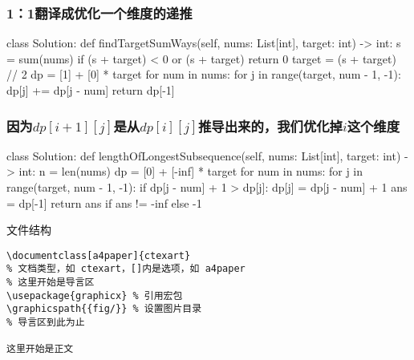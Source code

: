 \begin{frame}[fragile]          %
  \frametitle{1：1翻译成优化一个维度的递推}
  \begin{codeblock}[language=python]{}
class Solution:
    def findTargetSumWays(self, nums: List[int], target: int) -> int:
        s = sum(nums)
        if (s + target) < 0 or (s + target) %
            return 0
        target = (s + target) // 2
        dp = [1] + [0] * target
        for num in nums:
            for j in range(target, num - 1, -1):
                dp[j] += dp[j - num]
        return dp[-1]
  \end{codeblock}
\end{frame}


\begin{frame}[fragile]          %
  \frametitle{因为$dp[i+1][j]$是从$dp[i][j]$推导出来的，我们优化掉$i$这个维度}
  \begin{codeblock}[language=python]{}
class Solution:
    def lengthOfLongestSubsequence(self, nums: List[int], target: int) -> int:
        n = len(nums)
        dp = [0] + [-inf] * target
        for num in nums:
            for j in range(target, num - 1, -1):
                if dp[j - num] + 1 > dp[j]:
                    dp[j] = dp[j - num] + 1
        ans = dp[-1]
        return ans if ans != -inf else -1
  \end{codeblock}
\end{frame}

\begin{frame}[fragile]{文件结构}
  \lstset{language=[LaTeX]TeX}
  \begin{lstlisting}[basicstyle=\ttfamily]
\documentclass[a4paper]{ctexart}
% 文档类型，如 ctexart，[]内是选项，如 a4paper
% 这里开始是导言区
\usepackage{graphicx} % 引用宏包
\graphicspath{{fig/}} % 设置图片目录
% 导言区到此为止

这里开始是正文

  \end{lstlisting}
\end{frame}

